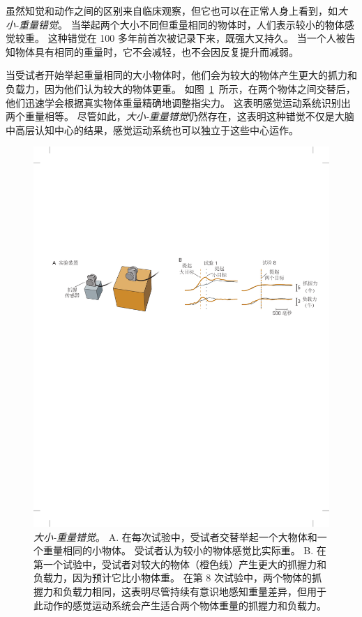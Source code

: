 虽然知觉和动作之间的区别来自临床观察，但它也可以在正常人身上看到，如\textit{大小-重量错觉}。
当举起两个大小不同但重量相同的物体时，人们表示较小的物体感觉较重。
这种错觉在 100 多年前首次被记录下来，既强大又持久。
当一个人被告知物体具有相同的重量时，它不会减轻，也不会因反复提升而减弱。


当受试者开始举起重量相同的大小物体时，他们会为较大的物体产生更大的抓力和负载力，因为他们认为较大的物体更重。
如图~\ref{fig:30_7}~所示，在两个物体之间交替后，他们迅速学会根据真实物体重量精确地调整指尖力。 
这表明感觉运动系统识别出两个重量相等。
尽管如此，\textit{大小-重量错觉}仍然存在，这表明这种错觉不仅是大脑中高层认知中心的结果，感觉运动系统也可以独立于这些中心运作。


\begin{figure}[htbp]
	\centering
	\includegraphics[width=1.0\linewidth]{chap30/fig_30_7}
	\caption{\textit{大小-重量错觉}。
		A. 在每次试验中，受试者交替举起一个大物体和一个重量相同的小物体。
		受试者认为较小的物体感觉比实际重。
		B. 在第一个试验中，受试者对较大的物体（橙色线）产生更大的抓握力和负载力，因为预计它比小物体重。
		在第 8 次试验中，两个物体的抓握力和负载力相同，这表明尽管持续有意识地感知重量差异，但用于此动作的感觉运动系统会产生适合两个物体重量的抓握力和负载力\cite{flanagan2000independence}。}
	\label{fig:30_7}
\end{figure}



